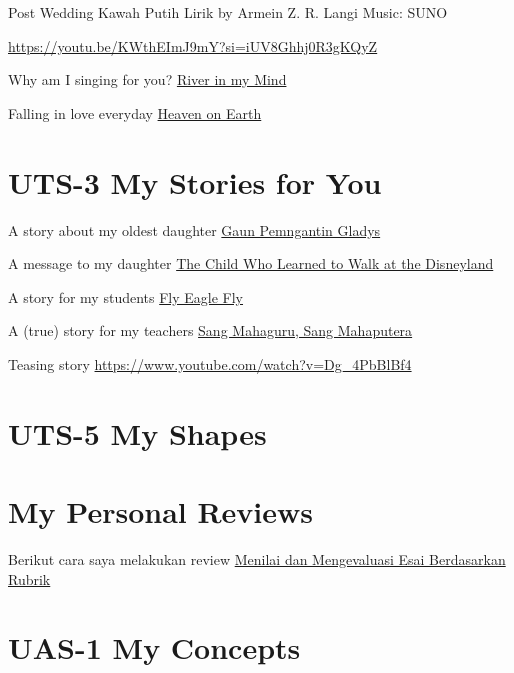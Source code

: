 \documentclass[
  letterpaper,
  DIV=11,
  numbers=noendperiod]{scrreprt}
\begin{document}
Post Wedding Kawah Putih Lirik by Armein Z. R. Langi Music: SUNO

\url{https://youtu.be/KWthEImJ9mY?si=iUV8Ghhj0R3gKQyZ}

Why am I singing for you? \href{./Rivers\%20In\%20My\%20Mind.mp3}{River
in my Mind}

Falling in love everyday \href{./Heaven\%20on\%20Earth.mp3}{Heaven on
Earth}


\chapter{UTS-3 My Stories for You}\label{uts-3-my-stories-for-you}

A story about my oldest daughter
\href{https://azrl.wordpress.com/2020/07/18/gaun-pengantin-gladys/\#comment-28004}{Gaun
Pemngantin Gladys}

A message to my daughter
\href{https://azrl.wordpress.com/2021/10/06/the-child-who-learned-to-walk-at-the-disneyland/}{The
Child Who Learned to Walk at the Disneyland}

A story for my students
\href{https://azrl.wordpress.com/2008/04/21/fly-my-eagle-fly/}{Fly Eagle
Fly}

A (true) story for my teachers
\href{\%3Chttps://azrl.wordpress.com/2012/11/28/perginya-sang-mahaputera-dan-mahaguru-berkemeja-putih/}{Sang
Mahaguru, Sang Mahaputera}

Teasing story \url{https://www.youtube.com/watch?v=Dg_4PbBlBf4}


\chapter{UTS-5 My Shapes}\label{uts-5-my-shapes}


\chapter{My Personal Reviews}\label{my-personal-reviews}

Berikut cara saya melakukan review
\href{./Doc.5.Mengevaluasi-Esai-Berdasarkan-Rubrik.pdf}{Menilai dan
Mengevaluasi Esai Berdasarkan Rubrik}


\chapter{UAS-1 My Concepts}\label{uas-1-my-concepts}
\end{document}

